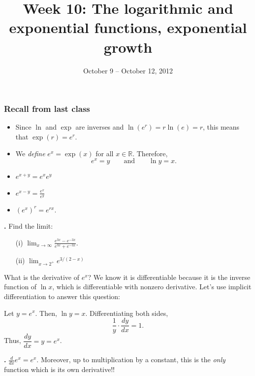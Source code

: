 \documentclass[t]{beamer}
\title{Week 10:  The logarithmic and exponential functions, exponential growth}
\date{October 9 -- October 12, 2012}
\theoremstyle{plain}
\theoremstyle{definition}
\newcounter{heading}
\newcommand{\newhead}[1]{\medskip\stepcounter{heading}\noindent\textbf{\hspace{0.2cm}{#1}.}}
\newcommand{\limm}[1]{\displaystyle \lim_{x\to #1}}
\begin{document}
\frame{\titlepage}

\setcounter{tocdepth}{2}


\begin{frame}
\frametitle{Recall from last class}
\begin{itemize}[<+->]
\item Since $\ln$ and $\exp$ are inverses and $\ln(e^{r}) = r\ln(e) = r$, this means that $\exp(r) = e^{r}$.
\item We \emph{define} $e^{x} = \exp(x)$ for all  $x \in \mathbb{R}$.  Therefore,
\[ e^{x} = y \qquad \text{and} \qquad \ln y = x.\]
\item $e^{x+y} = e^{x}e^{y}$
\item $e^{x-y} = \frac{e^{x}}{e^{y}}$
\item $(e^{x})^{r} = e^{rx}.$
\end{itemize}
\end{frame}

\begin{frame}
\newhead{Examples}
Find the limit:
\begin{enumerate}[<+->]
\item[(i)] $\limm{\infty} \frac{e^{3x} - e^{-3x}}{e^{3x} + e^{-3x}}$.

\vspace*{.5cm}

\item[(ii)] $\limm{2^{+}}e^{3/(2-x)}$
\end{enumerate}
\end{frame}

\begin{frame}
\noindent What is the derivative of $e^{x}$?  We know it is differentiable because it is the inverse function of $\ln x$, which is differentiable with nonzero derivative.  Let's use implicit differentiation to answer this question:\pause

\vspace*{.4cm}
\noindent Let $y=e^x$. Then, $\ln y=x$. \pause Differentiating both sides,
\[ \frac{1}{y}\cdot\frac{dy}{dx}=1.\]\pause
Thus, $\dfrac{dy}{dx}=y=e^x$.\pause

\newhead{(Important) derivative} $\frac{d}{dx}e^{x} = e^{x}$.  Moreover, up to multiplication by a constant, this is the \emph{only} function which is its own derivative!!
\end{frame}
\end{document}
